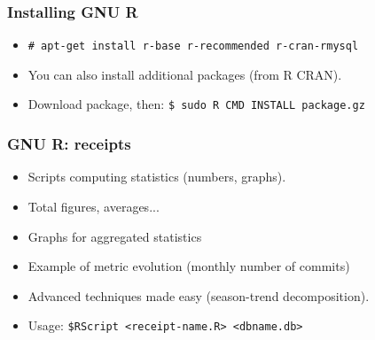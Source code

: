 \documentclass{beamer}
\begin{document}
\begin{frame}
\frametitle{Installing GNU R}
 \begin{itemize}
 \item \texttt{\# apt-get install r-base r-recommended r-cran-rmysql}
 \item You can also install additional packages (from R CRAN).
 \item Download package, then: 
\texttt{\$ sudo R CMD INSTALL package.gz}
 \end{itemize}
\end{frame}

\begin{frame}
\frametitle{GNU R: receipts}
 \begin{itemize}
 \item Scripts computing statistics (numbers, graphs).
 \item Total figures, averages...
 \item Graphs for aggregated statistics
 \item Example of metric evolution (monthly number of commits)
 \item Advanced techniques made easy (season-trend decomposition).
 \item Usage: \texttt{\$RScript <receipt-name.R> <dbname.db>}
 \end{itemize}
\end{frame}
\end{document}
